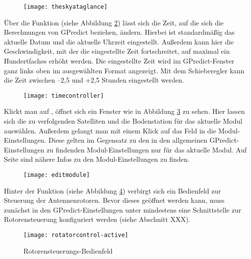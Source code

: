 \begin{figure}[h]
	\centering
	\texttt{[image: theskyataglance]}
	\caption{}
	\label{fig:theskyataglance} 
\end{figure}

\clearpage

Über die Funktion  (siehe Abbildung \ref{fig:timecontroller}) lässt sich die Zeit, auf die sich die Berechnungen von GPredict beziehen, ändern. Hierbei ist standardmäßig das aktuelle Datum und die aktuelle Uhrzeit eingestellt. Außerdem kann hier die Geschwindigkeit, mit der die eingestellte Zeit fortschreitet, auf maximal ein Hundertfaches erhöht werden. Die eingestellte Zeit wird im GPredict-Fenster ganz links oben im ausgewählten Format angezeigt. Mit dem Schieberegler kann die Zeit zwischen --2,5 und +2,5 Stunden eingestellt werden.

\begin{figure}[h]
	\centering
	\texttt{[image: timecontroller]}
	\caption{}
	\label{fig:timecontroller} 
\end{figure}

Klickt man auf , öffnet sich ein Fenster wie in Abbildung \ref{fig:editmodule} zu sehen. Hier lassen sich die zu verfolgenden Satelliten und die Bodenstation für das aktuelle Modul auswählen. Außerdem gelangt man mit einem Klick auf das Feld  in die Modul-Einstellungen. Diese gelten im Gegensatz zu den in den allgemeinen GPredict-Einstellungen zu findenden Modul-Einstellungen nur für das aktuelle Modul. Auf Seite \pageref{modulesettingsgeneral} sind nähere Infos zu den Modul-Einstellungen zu finden.
\label{modulesettingsspecific}

\begin{figure}[h]
	\centering
	\texttt{[image: editmodule]}
	\caption{}
	\label{fig:editmodule} 
\end{figure}

\clearpage

Hinter der Funktion  (siehe Abbildung \ref{fig:rotatorcontrol}) verbirgt sich ein Bedienfeld zur Steuerung der Antennenrotoren. Bevor dieses geöffnet werden kann, muss zunächst in den GPredict-Einstellungen unter  mindestens eine Schnittstelle zur Rotorensteuerung konfiguriert werden (siehe Abschnitt XXX). 
\begin{figure}[h]
	\centering
	\texttt{[image: rotatorcontrol-active]}
	\caption{Rotorensteuerungs-Bedienfeld}
	\label{fig:rotatorcontrol} 
\end{figure}

